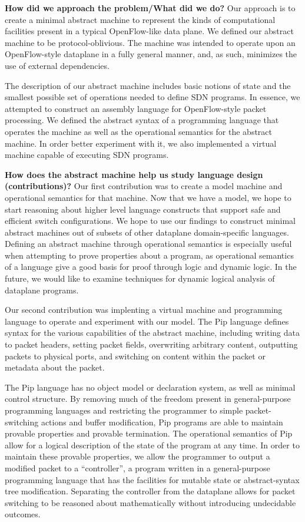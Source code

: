 \textbf{How did we approach the problem/What did we do?}
Our approach is to create a minimal abstract machine to represent the kinds of computational facilities present in a typical OpenFlow-like data plane. We defined our abstract machine to be protocol-oblivious. The machine was intended to operate upon an OpenFlow-style dataplane in a fully general manner, and, as such, minimizes the use of external dependencies.

The description of our abstract machine includes basic notions of state and the smallest possible set of operations needed to define SDN programs.
In essence, we attempted to construct an assembly language for OpenFlow-style packet processing. We defined the abstract syntax of a programming language that operates the machine as well as the operational semantics for the abstract machine. In order better experiment with it, we also implemented a virtual machine capable of executing SDN programs. 

\textbf{How does the abstract machine help us study language design (contributions)?}
Our first contribution was to create a model machine and operational semantics for that machine. Now that we have a model, we hope to start reasoning about higher level language constructs that support safe and efficient switch configurations. We hope to use our findings to construct minimal abstract machines out of subsets of other dataplane domain-specific languages. Defining an abstract machine through operational semantics is especially useful when attempting to prove properties about a program, as operational semantics of a language give a good basis for proof through logic and dynamic logic. In the future, we would like to examine techniques for dynamic logical analysis of dataplane programs.

Our second contribution was implenting a virtual machine and programming language to operate and experiment with our model. The Pip language defines syntax for the various capabilities of the abstract machine, including writing data to packet headers, setting packet fields, overwriting arbitrary content, outputting packets to physical ports, and switching on content within the packet or metadata about the packet. 

The Pip language has no object model or declaration system, as well as minimal control structure. By removing much of the freedom present in general-purpose programming languages and restricting the programmer to simple packet-switching actions and buffer modification, Pip programs are able to maintain provable properties and provable termination. The operational semantics of Pip allow for a logical description of the state of the program at any time. In order to maintain these provable properties, we allow the programmer to output a modified packet to a ``controller'', a program written in a general-purpose programming language that has the facilities for mutable state or abstract-syntax tree modification. Separating the controller from the dataplane allows for packet switching to be reasoned about mathematically without introducing undecidable outcomes.

